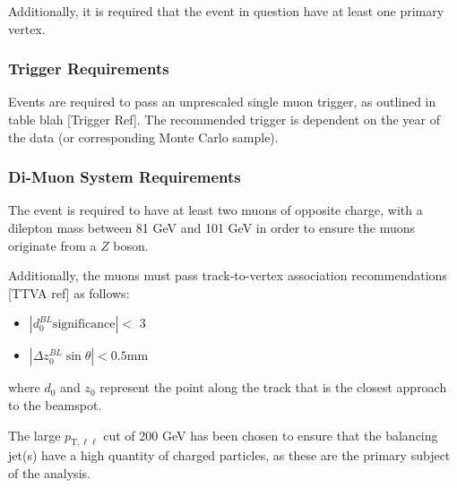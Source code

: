 Additionally, it is required that the event in question have at least one primary vertex.

\subsubsection{Trigger Requirements}
Events are required to pass an unprescaled single muon trigger, as outlined in table blah [Trigger Ref]. The recommended trigger is dependent on the year of the data (or corresponding Monte Carlo sample).

\subsubsection{Di-Muon System Requirements}
The event is required to have at least two muons of opposite charge, with a dilepton mass between 81 GeV and 101 GeV in order to ensure the muons originate from a $Z$ boson.

Additionally, the muons must pass track-to-vertex association recommendations [TTVA ref] as follows:

\begin{itemize}
    \item $|d_0^{BL}\text{significance}| < $ 3
    \item $|\Delta z_0^{BL}\sin\theta| < 0.5 $mm
\end{itemize}

where $d_0$ and $z_0$ represent the point along the track that is the closest approach to the beamspot.

The large $p_{\text{T},\ell\ell}$ cut of 200 GeV has been chosen to ensure that the balancing jet(s) have a high quantity of charged particles, as these are the primary subject of the analysis.
